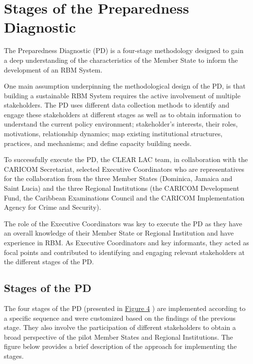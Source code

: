 \documentclass[
  10pt,
]{book}
\begin{document}
\hypertarget{stages-of-the-preparedness-diagnostic}{%
\section{Stages of the Preparedness Diagnostic}\label{stages-of-the-preparedness-diagnostic}}

The Preparedness Diagnostic (PD) is a four-stage methodology designed to gain a deep understanding of the characteristics of the Member State to inform the development of an RBM System.

One main assumption underpinning the methodological design of the PD, is that building a sustainable RBM System requires the active involvement of multiple stakeholders. The PD uses different data collection methods to identify and engage these stakeholders at different stages as well as to obtain information to understand the current policy environment; stakeholder's interests, their roles, motivations, relationship dynamics; map existing institutional structures, practices, and mechanisms; and define capacity building needs.

To successfully execute the PD, the CLEAR LAC team, in collaboration with the CARICOM Secretariat, selected Executive Coordinators who are representatives for the collaboration from the three Member States (Dominica, Jamaica and Saint Lucia) and the three Regional Institutions (the CARICOM Development Fund, the Caribbean Examinations Council and the CARICOM Implementation Agency for Crime and Security).

The role of the Executive Coordinators was key to execute the PD as they have an overall knowledge of their Member State or Regional Institution and have experience in RBM. As Executive Coordinators and key informants, they acted as focal points and contributed to identifying and engaging relevant stakeholders at the different stages of the PD.

\hypertarget{stages-of-the-pd}{%
\subsection*{Stages of the PD}\label{stages-of-the-pd}}

The four stages of the PD (presented in \protect\hyperlink{fig:figure4}{Figure 4} ) are implemented according to a specific sequence and were customized based on the findings of the previous stage. They also involve the participation of different stakeholders to obtain a broad perspective of the pilot Member States and Regional Institutions. The figure below provides a brief description of the approach for implementing the stages.
\end{document}

